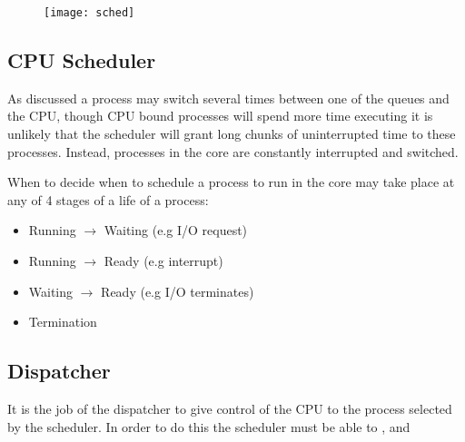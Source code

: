 	\begin{figure}[H]
		\begin{center}
		\texttt{[image: sched]}
		\end{center}
	\end{figure}

	\subsection{CPU Scheduler}



		\par{As discussed a process may switch several times between one of the queues and the CPU, though CPU bound processes will spend more time executing it is unlikely that the scheduler will grant long chunks of uninterrupted time to these processes. Instead, processes in the core are constantly interrupted and switched.}


		\par{When to decide when to schedule a process to run in the core may take place at any of 4 stages of a life of a process:}

			\begin{itemize}
				\item[] Running $\to$ Waiting (e.g I/O request)
				\item[] Running $\to$ Ready (e.g interrupt)
				\item[] Waiting $\to$ Ready (e.g I/O terminates)
				\item[] Termination 
			\end{itemize}

	\subsection{Dispatcher}


		\par{It is the job of the dispatcher to give control of the CPU to the process selected by the scheduler. In order to do this the scheduler must be able to ,  and }

